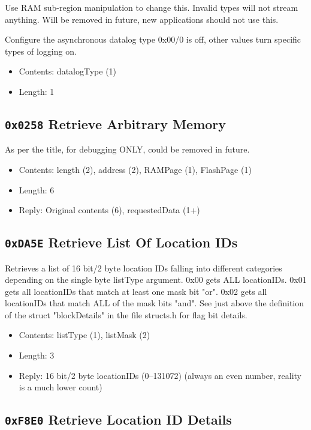 \documentclass[12pt,a4paper,titlepage]{article}
\begin{document}
\begin{titlepage}
\begin{center}
Use RAM sub-region manipulation to change this. Invalid types will not stream anything. Will be removed in future, new applications should not use this.

Configure the asynchronous datalog type 0x00/0 is off, other values turn specific types of logging on.

\begin{itemize}
\item Contents: datalogType (1)
\item Length: 1
\end{itemize}


\newpage
\subsection{\texttt{0x0258} Retrieve Arbitrary Memory}

As per the title, for debugging ONLY, could be removed in future.

\begin{itemize}
\item Contents: length (2), address (2), RAMPage (1), FlashPage (1)
\item Length: 6
\item Reply: Original contents (6), requestedData (1+)
\end{itemize}


\subsection{\texttt{0xDA5E} Retrieve List Of Location IDs}

Retrieves a list of 16 bit/2 byte location IDs falling into different categories depending on the single byte listType argument. 0x00 gets ALL locationIDs. 0x01 gets all locationIDs that match at least one mask bit "or". 0x02 gets all locationIDs that match ALL of the mask bits "and". See just above the definition of the struct "blockDetails" in the file structs.h for flag bit details.

\begin{itemize}
\item Contents: listType (1), listMask (2)
\item Length: 3
\item Reply: 16 bit/2 byte locationIDs (0--131072) (always an even number, reality is a much lower count)
\end{itemize}


\subsection{\texttt{0xF8E0} Retrieve Location ID Details}


\end{center}
\end{titlepage}
\end{document}
